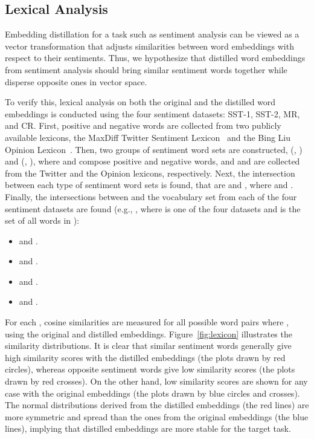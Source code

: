 \documentclass{article}
\begin{document}
\subsection{Lexical Analysis}
\label{sssec:lexiconanalysis}


Embedding distillation for a task such as sentiment analysis can be viewed as a vector transformation that adjusts similarities between word embeddings with respect to their sentiments.
Thus, we hypothesize that distilled word embeddings from sentiment analysis should bring similar sentiment words together while disperse opposite ones in vector space.

To verify this, lexical analysis on both the original and the distilled word embeddings is conducted using the four sentiment datasets: SST-1, SST-2, MR, and CR.
First, positive and negative words are collected from two publicly available lexicons, the MaxDiff Twitter Sentiment Lexicon~\cite{kiritchenko2014sentiment} and the Bing Liu Opinion Lexicon~\cite{hu2004mining}.
Then, two groups of sentiment word sets are constructed, (, ) and (, ), where  and  compose positive and negative words, and  and  are collected from the Twitter and the Opinion lexicons, respectively.
Next, the intersection between each type of sentiment word sets is found, that are  and , where  and .
Finally, the intersections between  and the vocabulary set from each of the four sentiment datasets are found (e.g., , where  is one of the four datasets and  is the set of all words in ):


\begin{itemize}
	\item  and .
    \item  and .
    \item  and .
    \item  and .
\end{itemize}

\noindent For each , cosine similarities are measured for all possible word pairs  where , using the original and distilled embeddings.
Figure~\ref{fig:lexicon} illustrates the similarity distributions.
It is clear that similar sentiment words generally give high similarity scores with the distilled embeddings (the plots drawn by red circles), whereas opposite sentiment words give low similarity scores (the plots drawn by red crosses).
On the other hand, low similarity scores are shown for any case with the original embeddings (the plots drawn by blue circles and crosses).
The normal distributions derived from the distilled embeddings (the red lines) are more symmetric and spread than the ones from the original embeddings (the blue lines), implying that distilled embeddings are more stable for the target task.
\end{document}
